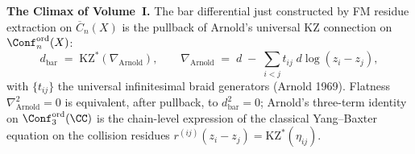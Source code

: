 %
%
%
%
%



\medskip\noindent
\textbf{The Climax of Volume~I.}
The bar differential just constructed by FM residue extraction on
$\overline{C}_{n}(X)$ is the pullback of Arnold's universal KZ
connection on $\Conf_{n}^{\mathrm{ord}}(X)$:
\[
  d_{\mathrm{bar}}
  \;=\;
  \mathrm{KZ}^{*}(\nabla_{\mathrm{Arnold}}),
  \qquad
  \nabla_{\mathrm{Arnold}}
  \;=\;
  d \;-\; \sum_{i<j} t_{ij}\;d\log(z_{i}-z_{j}),
\]
with $\{t_{ij}\}$ the universal infinitesimal braid generators
(Arnold 1969). Flatness $\nabla_{\mathrm{Arnold}}^{2} = 0$ is
equivalent, after pullback, to $d_{\mathrm{bar}}^{2} = 0$;
Arnold's three-term identity on $\Conf_{3}^{\mathrm{ord}}(\CC)$
is the chain-level expression of the classical Yang--Baxter equation
on the collision residues
$r^{(ij)}(z_{i}-z_{j}) = \mathrm{KZ}^{*}(\eta_{ij})$.


